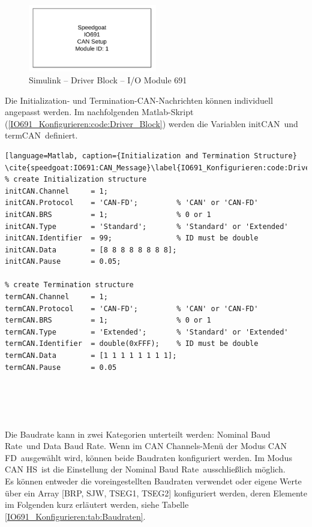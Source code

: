 \pagebreak[1]
\begin{figure}[!ht]
	\begin{center}
		\includegraphics[width=0.5\textwidth]{img/4_simulink/IO691.png}
		\caption{Simulink – Driver Block – I/O Module 691 \cite{speedgoat:IO691}}
		\label{IO691_Konfigurieren:img:Driver_Block}
	\end{center}
\end{figure}
\pagebreak[1]


Die \frqq Initialization\flqq- und \frqq Termination\flqq-CAN-Nachrichten können individuell angepasst werden. Im nachfolgenden Matlab-Skript (\ref{IO691_Konfigurieren:code:Driver_Block}) werden die Variablen \frqq initCAN\flqq\ und \frqq termCAN\flqq\ definiert.



\pagebreak[4]
\begin{lstlisting}[language=Matlab, caption={Initialization and Termination Structure} \cite{speedgoat:IO691:CAN_Message}\label{IO691_Konfigurieren:code:Driver_Block}]
% create Initialization structure
initCAN.Channel     = 1;
initCAN.Protocol    = 'CAN-FD';         % 'CAN' or 'CAN-FD'
initCAN.BRS         = 1;                % 0 or 1
initCAN.Type        = 'Standard';       % 'Standard' or 'Extended'
initCAN.Identifier  = 99;               % ID must be double
initCAN.Data        = [8 8 8 8 8 8 8 8];
initCAN.Pause       = 0.05;

% create Termination structure
termCAN.Channel     = 1;
termCAN.Protocol    = 'CAN-FD';         % 'CAN' or 'CAN-FD'
termCAN.BRS         = 1;                % 0 or 1
termCAN.Type        = 'Extended';       % 'Standard' or 'Extended'     
termCAN.Identifier  = double(0xFFF);    % ID must be double
termCAN.Data        = [1 1 1 1 1 1 1 1];
termCAN.Pause       = 0.05



 
\end{lstlisting}
\pagebreak[1]

Die Baudrate kann in zwei Kategorien unterteilt werden: \frqq Nominal Baud Rate\flqq\ und \frqq Data Baud Rate\flqq. Wenn im \frqq CAN Channels\flqq-Menü der Modus \frqq CAN FD\flqq\ ausgewählt wird, können beide Baudraten konfiguriert werden. Im Modus \frqq CAN HS\flqq\ ist die Einstellung der \frqq Nominal Baud Rate\flqq\ ausschließlich möglich. \\
Es können entweder die voreingestellten Baudraten verwendet oder eigene Werte über ein Array [BRP, SJW, TSEG1, TSEG2] konfiguriert werden, deren Elemente im Folgenden kurz erläutert werden, siehe Tabelle \ref{IO691_Konfigurieren:tab:Baudraten}.


